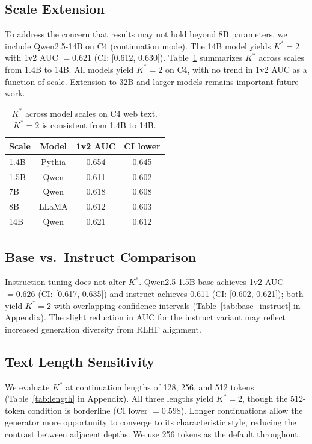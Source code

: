 \documentclass[11pt]{article}
\begin{document}
\subsection{Scale Extension}

To address the concern that results may not hold beyond 8B parameters, we include Qwen2.5-14B on C4 (continuation mode). The 14B model yields $K^* = 2$ with 1v2 AUC $= 0.621$ (CI: [0.612, 0.630]). Table~\ref{tab:scale} summarizes $K^*$ across scales from 1.4B to 14B. All models yield $K^* = 2$ on C4, with no trend in 1v2 AUC as a function of scale. Extension to 32B and larger models remains important future work.

\begin{table}[t]
\centering
\caption{$K^*$ across model scales on C4 web text. $K^* = 2$ is consistent from 1.4B to 14B.}
\label{tab:scale}
\small
\begin{tabular}{lccc}
\toprule
Scale & Model & 1v2 AUC & CI lower \\
\midrule
1.4B & Pythia & 0.654 & 0.645 \\
1.5B & Qwen & 0.611 & 0.602 \\
7B & Qwen & 0.618 & 0.608 \\
8B & LLaMA & 0.612 & 0.603 \\
14B & Qwen & 0.621 & 0.612 \\
\bottomrule
\end{tabular}
\end{table}

\subsection{Base vs.\ Instruct Comparison}

Instruction tuning does not alter $K^*$. Qwen2.5-1.5B base achieves 1v2 AUC $= 0.626$ (CI: [0.617, 0.635]) and instruct achieves 0.611 (CI: [0.602, 0.621]); both yield $K^* = 2$ with overlapping confidence intervals (Table~\ref{tab:base_instruct} in Appendix). The slight reduction in AUC for the instruct variant may reflect increased generation diversity from RLHF alignment.

\subsection{Text Length Sensitivity}

We evaluate $K^*$ at continuation lengths of 128, 256, and 512 tokens (Table~\ref{tab:length} in Appendix). All three lengths yield $K^* = 2$, though the 512-token condition is borderline (CI lower $= 0.598$). Longer continuations allow the generator more opportunity to converge to its characteristic style, reducing the contrast between adjacent depths. We use 256 tokens as the default throughout.
\end{document}
